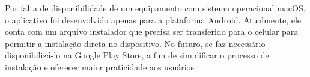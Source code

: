 Por falta de disponibilidade de um equipamento com sistema operacional macOS, o aplicativo foi desenvolvido apenas para a plataforma Android. Atualmente, ele conta com um arquivo instalador que precisa ser transferido para o celular para permitir a instalação direta no dispositivo. No futuro, se faz necessário disponibilizá-lo na Google Play Store, a fim de simplificar o processo de instalação e oferecer maior praticidade aos usuários

